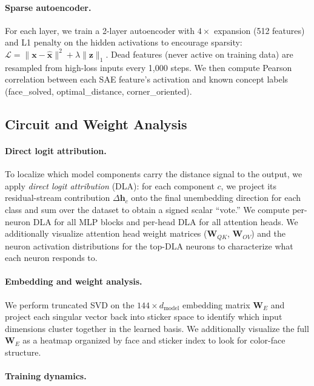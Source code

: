 \documentclass[12pt]{article}
\begin{document}
\paragraph{Sparse autoencoder.}

For each layer, we train a 2-layer autoencoder with $4{\times}$ expansion (512
features) and L1 penalty on the hidden activations to encourage sparsity:
$\mathcal{L} = \|\mathbf{x} - \hat{\mathbf{x}}\|^2 + \lambda \|\mathbf{z}\|_1$.
Dead features (never active on training data) are resampled from high-loss inputs
every 1,000 steps.  We then compute Pearson correlation between each SAE feature's
activation and known concept labels (face\_solved, optimal\_distance,
corner\_oriented).

\subsection{Circuit and Weight Analysis}

\paragraph{Direct logit attribution.}

To localize which model components carry the distance signal to the output, we
apply \emph{direct logit attribution} (DLA): for each component $c$, we project
its residual-stream contribution $\Delta\mathbf{h}_c$ onto the final unembedding
direction for each class and sum over the dataset to obtain a signed scalar
``vote.''  We compute per-neuron DLA for all MLP blocks and per-head DLA for all
attention heads.  We additionally visualize attention head weight matrices
($\mathbf{W}_{QK}$, $\mathbf{W}_{OV}$) and the neuron activation distributions
for the top-DLA neurons to characterize what each neuron responds to.

\paragraph{Embedding and weight analysis.}

We perform truncated SVD on the $144 \times d_\text{model}$ embedding matrix
$\mathbf{W}_E$ and project each singular vector back into sticker space to
identify which input dimensions cluster together in the learned basis.  We
additionally visualize the full $\mathbf{W}_E$ as a heatmap organized by face
and sticker index to look for color-face structure.

\paragraph{Training dynamics.}
\end{document}
